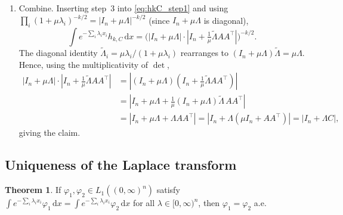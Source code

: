 \documentclass[14pt]{extarticle}
\makeatletter
\theoremstyle{definition}
\newtheorem{theorem}{Theorem}[section]
\renewenvironment{proof}[1][\proofname]{\par
  \pushQED{\qed}%
  \normalfont \topsep6\p@\@plus6\p@\relax
  \trivlist
  \item[\hskip\labelsep\bfseries #1\@addpunct{.}]\ignorespaces
}{%
  \popQED\endtrivlist\@endpefalse
}
\newcommand{\dd}{\mathrm{d}}
\makeatother
\begin{document}
\begin{proof}
\begin{enumerate}
    \item Combine.  Inserting step~3 into \eqref{eq:hkC_step1} and
      using $\prod_i(1+\mu\lambda_i)^{-k/2}=|I_n+\mu\Lambda|^{-k/2}$
      (since $I_n+\mu\Lambda$ is diagonal),
      \[
        \int e^{-\sum_i\lambda_ix_i}h_{k,C}\,\dd x
        =\bigl(|I_n+\mu\Lambda|\cdot
          |I_n+\tfrac{1}{\mu}\tilde\Lambda AA^\top|\bigr)^{-k/2}.
      \]
      The diagonal identity
      $\tilde\Lambda_i=\mu\lambda_i/(1+\mu\lambda_i)$ rearranges to
      $(I_n+\mu\Lambda)\tilde\Lambda=\mu\Lambda$.  Hence, using the
      multiplicativity of $\det$,
      \begin{align*}
        |I_n+\mu\Lambda|\cdot|I_n+\tfrac{1}{\mu}\tilde\Lambda AA^\top|
        &=|(I_n+\mu\Lambda)(I_n+\tfrac{1}{\mu}\tilde\Lambda AA^\top)|\\
        &=|I_n+\mu\Lambda
          +\tfrac{1}{\mu}(I_n+\mu\Lambda)\tilde\Lambda\,AA^\top|\\
        &=|I_n+\mu\Lambda+\Lambda AA^\top|
        =|I_n+\Lambda(\mu I_n+AA^\top)|=|I_n+\Lambda C|,
      \end{align*}
      giving the claim.
  \end{enumerate}
\end{proof}


\subsection{Uniqueness of the Laplace transform}

\begin{theorem}\label{thm:laplace_inj}
  If $\varphi_1,\varphi_2\in L_1((0,\infty)^n)$ satisfy
  $\int e^{-\sum_i\lambda_ix_i}\varphi_1\,\dd x
  =\int e^{-\sum_i\lambda_ix_i}\varphi_2\,\dd x$ for all
  $\lambda\in[0,\infty)^n$, then $\varphi_1=\varphi_2$ a.e.
\end{theorem}
\end{document}
